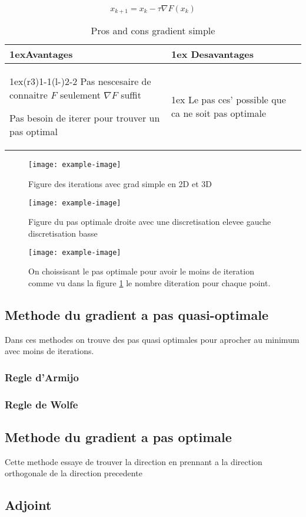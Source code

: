 \[x_{k+1} = x_k - \tau \nabla F(x_k)\]

\begin{table}[H]
    \begin{tabularx}{\linewidth}{>{\parskip1ex}X@{\kern4\tabcolsep}>{\parskip1ex}X}
    \toprule
    \hfil\bfseries Avantages
    &
    \hfil\bfseries Desavantages
    \\\cmidrule(r{3\tabcolsep}){1-1}\cmidrule(l{-\tabcolsep}){2-2}
    Pas nescesaire de connaitre $F$ seulement $\nabla F$ suffit\par
    Pas besoin de iterer pour trouver un pas optimal\par
    &
    Le pas ces' possible que ca ne soit pas optimale\par
    \\\bottomrule
    \end{tabularx}
    \caption{Pros and cons gradient simple}
\end{table}

\begin{figure}[H]
    \centering
    \texttt{[image: example-image]}
    \caption{Figure des iterations avec grad simple en 2D et 3D}
\end{figure}

\begin{figure}[H]
    \centering
    \texttt{[image: example-image]}
    \caption{Figure du pas optimale droite avec une discretisation elevee gauche discretisation basse}
    \label{fig_optimal_pas_graphe_discretisations}
\end{figure}

\begin{figure}[H]
    \centering
    \texttt{[image: example-image]}
    \caption{On choissisant le pas optimale pour avoir le moins de iteration comme vu dans la figure \ref{fig_optimal_pas_graphe_discretisations} le nombre diteration pour chaque point.}
\end{figure}

\subsection{Methode du gradient a pas quasi-optimale}
Dans ces methodes on trouve des pas quasi optimales pour aprocher au minimum avec moins de iterations.
\subsubsection{Regle d'Armijo}
\subsubsection{Regle de Wolfe}

\subsection{Methode du gradient a pas optimale}
Cette methode essaye de trouver la direction en prennant a la direction orthogonale de la direction precedente
\subsection{Adjoint}